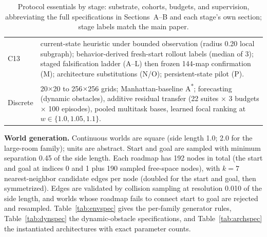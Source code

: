 \documentclass[letterpaper]{article} %
\newcommand{\stage}[1]{\textsc{#1}}
\begin{document}
\begin{table}[t]
\begin{tabular}{@{}lp{14.2cm}@{}}
\stage{C13} & current-state heuristic under bounded observation (radius 0.20 local subgraph); behavior-derived fresh-start rollout labels (median of 3); staged falsification ladder (\stage{A}--\stage{L}) then frozen 144-map confirmation (\stage{M}); architecture substitutions (\stage{N}/\stage{O}); persistent-state pilot (\stage{P}). \\
Discrete & 20$\times$20 to 256$\times$256 grids; Manhattan-baseline A\textsuperscript{*}; forecasting (dynamic obstacles), additive residual transfer (22 suites $\times$ 3 budgets $\times$ 100 episodes), pooled multitask bases, learned focal ranking at $w\in\{1.0,1.05,1.1\}$. \\
\bottomrule
\end{tabular}
\caption{Protocol essentials by stage: substrate, cohorts, budgets, and supervision, abbreviating the full specifications in Sections~A--B and each stage's own section; stage labels match the main paper.}
\label{tab:protocols}
\end{table}

\textbf{World generation.} Continuous worlds are square (side length 1.0; 2.0 for the large-room family); units are abstract. Start and goal are sampled with minimum separation 0.45 of the side length. Each roadmap has 192 nodes in total (the start and goal at indices 0 and 1 plus 190 sampled free-space nodes), with $k{=}7$ nearest-neighbor candidate edges per node (doubled for the start and goal, then symmetrized). Edges are validated by collision sampling at resolution 0.010 of the side length, and worlds whose roadmap fails to connect start to goal are rejected and resampled. Table~\ref{tab:envspec} gives the per-family generator rules, Table~\ref{tab:dynspec} the dynamic-obstacle specifications, and Table~\ref{tab:archspec} the instantiated architectures with exact parameter counts.
\end{document}
